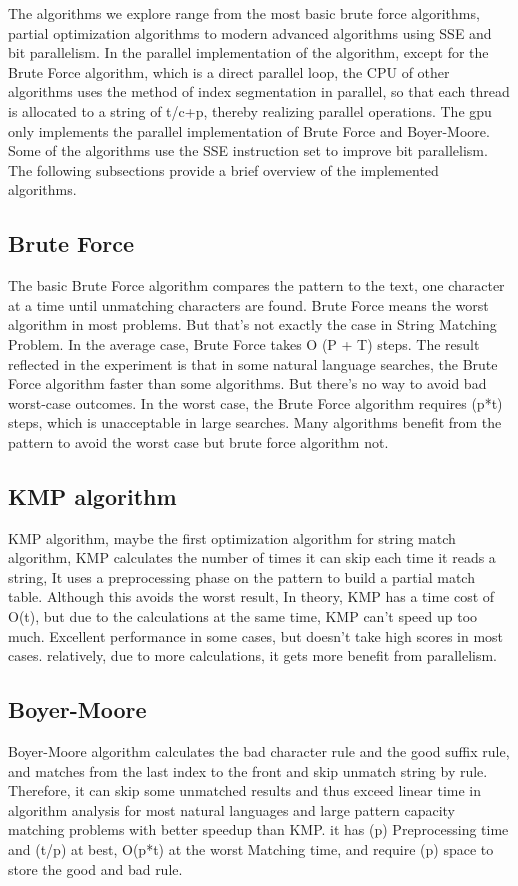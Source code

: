 \documentclass[11pt]{article}       %
\begin{document}
The algorithms we explore range from the most basic brute force algorithms, partial optimization algorithms to modern advanced algorithms using SSE and bit parallelism. In the parallel implementation of the algorithm, except for the Brute Force algorithm, which is a direct parallel loop, the CPU of other algorithms uses the method of index segmentation in parallel, so that each thread is allocated to a string of t/c+p, thereby realizing parallel operations. The gpu only implements the parallel implementation of Brute Force and Boyer-Moore. Some of the algorithms use the SSE instruction set to improve bit parallelism. The following subsections provide a brief overview of the implemented algorithms.


\subsection{Brute Force}\label{bf}
The basic Brute Force algorithm compares the pattern to the text, one character at a time until unmatching characters are found. Brute Force means the worst algorithm in most problems. But that's not exactly the case in String Matching Problem. In the average case, Brute Force takes O (P + T) steps. The result reflected in the experiment is that in some natural language searches, the Brute Force algorithm faster than some algorithms. But there's no way to avoid bad worst-case outcomes. In the worst case, the Brute Force algorithm requires (p*t) steps, which is unacceptable in large searches. Many algorithms benefit from the pattern to avoid the worst case but brute force algorithm not.

\subsection{KMP algorithm}\label{kmp}
KMP algorithm, maybe the first optimization algorithm\cite{KMP} for string match algorithm, KMP calculates the number of times it can skip each time it reads a string, It uses a preprocessing phase on the pattern to build a partial match table. Although this avoids the worst result, In theory, KMP has a time cost of O(t), but due to the calculations at the same time, KMP can’t speed up too much. Excellent performance in some cases, but doesn’t take high scores in most cases. relatively, due to more calculations, it gets more benefit from parallelism.

\subsection{Boyer-Moore}\label{bm}
Boyer-Moore algorithm calculates the bad character rule and the good suffix rule\cite{BM}, and matches from the last index to the front and skip unmatch string by rule. Therefore, it can skip some unmatched results and thus exceed linear time in algorithm analysis for most natural languages and large pattern capacity matching problems with better speedup than KMP. it has (p) Preprocessing time and  (t/p) at best, O(p*t) at the worst Matching time, and require (p) space to store the good and bad rule.
\end{document}
